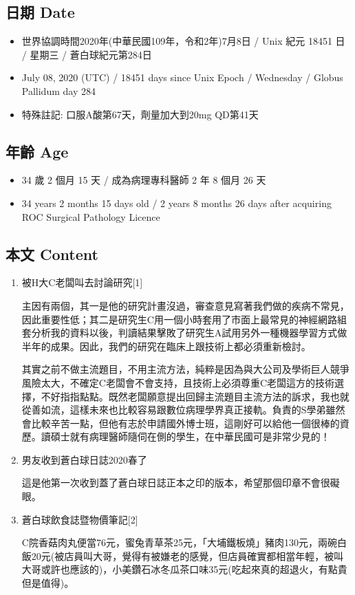 \documentclass[a5paper, 11pt
]{book}
\providecommand{\tightlist}{%
  \setlength{\itemsep}{0pt}\setlength{\parskip}{0pt}}
\begin{document}
\hypertarget{ux65e5ux671f-date-33}{%
\subsection{日期 Date}\label{ux65e5ux671f-date-33}}

\begin{itemize}
\tightlist
\item
  世界協調時間2020年(中華民國109年，令和2年)7月8日 / Unix 紀元 18451 日
  / 星期三 / 蒼白球紀元第284日
\item
  July 08, 2020 (UTC) / 18451 days since Unix Epoch / Wednesday / Globus
  Pallidum day 284
\item
  特殊註記: 口服A酸第67天，劑量加大到20mg QD第41天
\end{itemize}

\hypertarget{ux5e74ux9f61-age-33}{%
\subsection{年齡 Age}\label{ux5e74ux9f61-age-33}}

\begin{itemize}
\tightlist
\item
  34 歲 2 個月 15 天 / 成為病理專科醫師 2 年 8 個月 26 天
\item
  34 years 2 months 15 days old / 2 years 8 months 26 days after
  acquiring ROC Surgical Pathology Licence
\end{itemize}

\hypertarget{ux672cux6587-content-33}{%
\subsection{本文 Content}\label{ux672cux6587-content-33}}

\begin{enumerate}
\def\labelenumi{\arabic{enumi}.}
\item
  被H大C老闆叫去討論研究{[}1{]}

  主因有兩個，其一是他的研究計畫沒過，審查意見寫著我們做的疾病不常見，因此重要性低；其二是研究生C用一個小時套用了市面上最常見的神經網路組套分析我的資料以後，判讀結果擊敗了研究生A試用另外一種機器學習方式做半年的成果。因此，我們的研究在臨床上跟技術上都必須重新檢討。

  其實之前不做主流題目，不用主流方法，純粹是因為與大公司及學術巨人競爭風險太大，不確定C老闆會不會支持，且技術上必須尊重C老闆這方的技術選擇，不好指指點點。既然老闆願意提出回歸主流題目主流方法的訴求，我也就從善如流，這樣未來也比較容易跟數位病理學界真正接軌。負責的S學弟雖然會比較辛苦一點，但他有志於申請國外博士班，這剛好可以給他一個很棒的資歷。讀碩士就有病理醫師隨伺在側的學生，在中華民國可是非常少見的！
\item
  男友收到蒼白球日誌2020春了

  這是他第一次收到蓋了蒼白球日誌正本之印的版本，希望那個印章不會很礙眼。
\item
  蒼白球飲食誌暨物價筆記{[}2{]}

  C院香菇肉丸便當76元，蜜兔青草茶25元，「大埔鐵板燒」豬肉130元，兩碗白飯20元(被店員叫大哥，覺得有被嫌老的感覺，但店員確實都相當年輕，被叫大哥或許也應該的)，小美鑽石冰冬瓜茶口味35元(吃起來真的超退火，有點貴但是值得)。
\end{enumerate}
\end{document}
